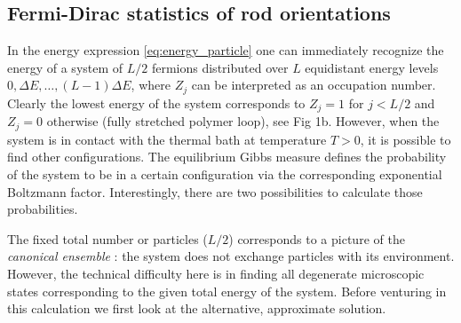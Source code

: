 \documentclass[aps,showpacs,twocolumn,floatfix,prx,superscriptaddress]{revtex4-1}
\begin{document}
\subsection{Fermi-Dirac statistics of rod orientations}
In the energy expression \eqref{eq:energy_particle} one can immediately recognize
the energy of a system of $L/2$ fermions distributed over
$L$ equidistant energy levels $0, \Delta E, \ldots, (L-1) \Delta E$, where
$Z_j$ can be interpreted as an occupation number. Clearly the lowest energy of the system corresponds to $Z_j = 1$ for $j < L/2$ and
$Z_j=0$ otherwise (fully stretched polymer loop), see Fig 1b. However, when the system is in contact with the thermal bath
at temperature $T>0$, it is possible to find other configurations. The equilibrium
Gibbs measure defines the probability of the system to be in a certain configuration via the corresponding exponential Boltzmann factor.
Interestingly, there are two possibilities to calculate those probabilities. 


The fixed total number or particles ($L/2$) corresponds to a picture of the
\emph{canonical ensemble} \cite{Chandler1987,Huang2001}: the system does not exchange particles with
its environment. However, the technical difficulty here is in finding all degenerate microscopic states corresponding to the given total energy of the system. Before venturing in this calculation we first look at the alternative, approximate solution.

\end{document}
